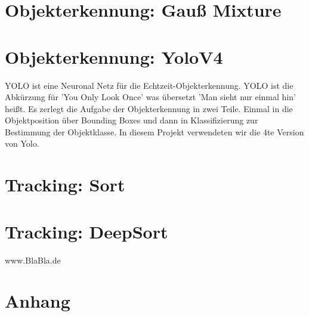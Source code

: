 \documentclass[conference]{IEEEtran}
\begin{document}
	\section{Objekterkennung: Gauß Mixture}
	
	\section{Objekterkennung: YoloV4}
	YOLO ist eine Neuronal Netz für die Echtzeit-Objekterkennung. YOLO ist die Abkürzung für 'You Only Look Once' was übersetzt 'Man sieht nur einmal hin' heißt. Es zerlegt die Aufgabe der Objekterkennung in zwei Teile. Einmal in die Objektposition über Bounding Boxes und dann in Klassifizierung zur Bestimmung der Objektklasse. In diesem Projekt verwendeten wir die 4te Version von Yolo.
	
	\section{Tracking: Sort}
	
	\section{Tracking: DeepSort}
	
	
	\begin{thebibliography}{00}
		www.BlaBla.de
	\end{thebibliography}
	
	
	
	\section{Anhang}
	
\end{document}

